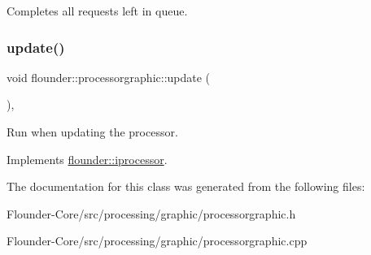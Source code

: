 Completes all requests left in queue. 

\mbox{\label{classflounder_1_1processorgraphic_a09711d00647681305dfd8067310ec257}} 
\subsubsection{\texorpdfstring{update()}{update()}}
{\footnotesize\ttfamily void flounder\+::processorgraphic\+::update (\begin{DoxyParamCaption}{ }\end{DoxyParamCaption})\hspace{0.3cm}{\ttfamily [override]}, {\ttfamily [virtual]}}



Run when updating the processor. 



Implements \hyperlink{classflounder_1_1iprocessor_ad2edfece3465ec3dbe0a5feac26bdbc3}{flounder\+::iprocessor}.



The documentation for this class was generated from the following files\+:\begin{DoxyCompactItemize}
\item 
Flounder-\/\+Core/src/processing/graphic/processorgraphic.\+h\item 
Flounder-\/\+Core/src/processing/graphic/processorgraphic.\+cpp\end{DoxyCompactItemize}
